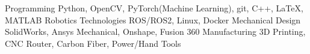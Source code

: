 

\begin{cvskills}
  \cvskill
  {Programming} %
  {Python, OpenCV, PyTorch(Machine Learning), git, C++, LaTeX, MATLAB} %
  \cvskill
  {Robotics Technologies}
  {ROS/ROS2, Linux, Docker}
  \cvskill
    {Mechanical Design} %
    {SolidWorks, Ansys Mechanical, Onshape, Fusion 360} %
  \cvskill
    {Manufacturing} %
    {3D Printing, CNC Router, Carbon Fiber, Power/Hand Tools} %
\end{cvskills}
